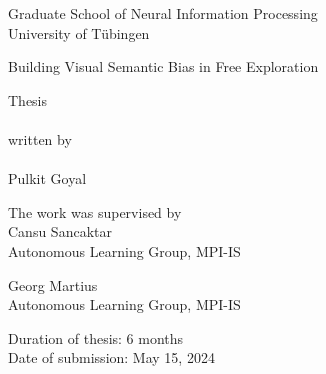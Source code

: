 \begin{titlepage}
   \begin{center}
        \vspace*{1cm}
        
        {\Large Graduate School of Neural Information Processing}\\
        \vspace{2pt}
        {\Large University of Tübingen}
        
        \vspace{56pt}
        
        Building Visual Semantic Bias in Free Exploration
        
        \vspace{66pt}
        Thesis\\~\\
        written by\\~\\
        Pulkit Goyal
        
        \vspace{76pt}
        The work was supervised by\\
        \vspace{11pt}
        Cansu Sancaktar\\
        Autonomous Learning Group, MPI-IS

        \vspace{11pt}
        Georg Martius\\
        Autonomous Learning Group, MPI-IS
        
        \vfill
        Duration of thesis: 6 months\\
        Date of submission: May 15, 2024
   \end{center}
\end{titlepage}